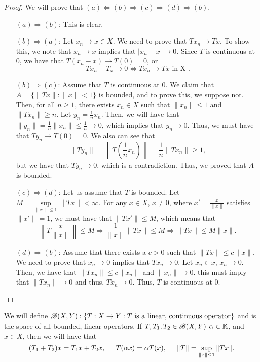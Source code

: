 \begin{proof}
We will prove that $(a) \Leftrightarrow (b) \Rightarrow (c) \Rightarrow (d) \Rightarrow (b)$. 
\begin{enumerate}
\item[$(a) \Rightarrow (b)$:] This is clear.
\item[$(b) \Rightarrow (a)$:] Let $x_n \to x \in X$. We need to prove that $Tx_n \to Tx$. To show this, we note that $x_n \to x$ implies that $|x_n - x| \to 0$. Since $T$ is continuous at 0, we have that $T(x_n - x) \to T(0) = 0$, or 
\[ Tx_n - T_x \to 0 \Longleftrightarrow Tx_n \to Tx \text{ in X }.\]
\item[$(b) \Rightarrow (c)$:] Assume that $T$ is continuous at 0. We claim that $A = \{ \| Tx \| : \| x \| < 1 \}$ is bounded, and to prove this, we suppose not. Then, for all $n \geq 1$, there exists $x_n \in X$ such that $\| x_n \| \leq 1$ and $\| Tx_n \| \geq n$. Let $y_n = \frac{1}{n} x_n$. Then, we will have that $\| y_n \| = \frac{1}{n} \| x_n \| \leq \frac{1}{n} \to 0$, which implies that $y_n \to 0$. Thus, we must have that $Ty_n \to T(0) = 0$. We also can see that 
\[ \| Ty_n \| = \left\| T \left(\frac{1}{n} x_n\right) \right\| = \frac{1}{n} \| T x_n \| \geq 1,\]
but we have that $Ty_n \to 0$, which is a contradiction. Thus, we proved that $A$ is bounded.
\item[$(c) \Rightarrow (d)$:] Let us assume that $T$ is bounded. Let $M = \sup\limits_{\| x \| \leq 1} \| Tx \| < \infty$. For any $x \in X$, $x \neq 0$, where $x' = \frac{x}{\| x \|}$ satisfies $\| x' \| = 1$, we must have that $\| Tx' \| \leq M$, which means that 
\[ \left\| T \frac{x}{\| x \|} \right\| \leq M \Longrightarrow \frac{1}{ \|x \|} \| Tx \| \leq M \Longrightarrow \| Tx \| \leq M \| x \|. \]
\item[$(d) \Rightarrow (b)$:] Assume that there exists a $c > 0$ such that $\| Tx \| \leq c \| x \|$. We need to prove that $x_n \to 0$ implies that $Tx_n \to 0$. Let $x_n \in x$, $x_n \to 0$. Then, we have that $\| T x_n \| \leq c \| x_n \|$ and $\| x_n \| \to 0$. this must imply that $\| Tx_n \| \to 0$ and thus, $Tx_n \to 0$. Thus, $T$ is continuous at 0. 
\end{enumerate}
\end{proof}
We will define $\mathscr{B}(X,Y) : \{ T: X \to Y : T \text{ is a linear, continuous operator} \}$ and is the space of all bounded, linear operators. If $T, T_1, T_2 \in \mathscr{B}(X, Y)$ $\alpha \in \mathbb{K}$, and $x \in X$, then we will have that 
\[ (T_1 + T_2)x = T_1 x + T_2 x, \hspace{5mm} T(\alpha x) = \alpha T(x), \hspace{5mm} \| T \| = \sup\limits_{\| x \| \leq 1 } \| Tx\|. \]
